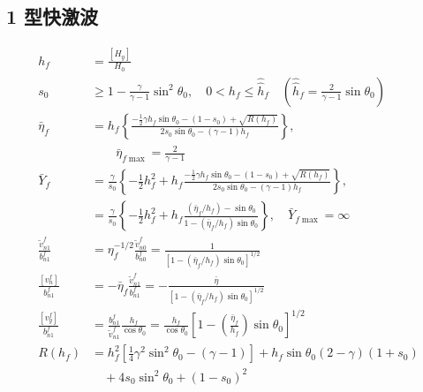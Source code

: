 \documentclass{article}
\begin{document}
\subsection{1 型快激波}
\begin{align}
h_f &= \frac{[H_y]}{H_0}
\\
s_0 &\ge 1 - \frac{\gamma}{\gamma-1} \sin^2\theta_0, \quad 0 < h_f \le \hat{\hat{h}}_f
\quad \left(\hat{\hat{h}}_f = \frac{2}{\gamma-1} \sin\theta_0\right)
\\
\bar{\eta}_f &= h_f \left\{\frac{-\frac{1}{2} \gamma h_f \sin\theta_0 - (1-s_0) +
\sqrt{R(h_f)}}{2s_0 \sin\theta_0 - (\gamma-1) h_f}\right\}, \nonumber\\
& \qquad \bar{\eta}_{f\max} = \frac{2}{\gamma-1}
\\
\bar{Y}_f &= \frac{\gamma}{s_0} \left\{-\frac{1}{2} h_f^2 + h_f \frac{-\frac{1}{2}
\gamma h_f \sin\theta_0 - (1-s_0) + \sqrt{R(h_f)}}{2s_0 \sin\theta_0 - (\gamma-1)
h_f}\right\}, \nonumber
\\
&= \frac{\gamma}{s_0} \left\{-\frac{1}{2} h_f^2 + h_f \frac{(\bar{\eta}_f/h_f) -
\sin\theta_0}{1 - (\bar{\eta}_f/h_f)\sin\theta_0}\right\}, \quad \bar{Y}_{f\max} = \infty
\\
\frac{\tilde{v}_{n1}^f}{b_{n1}^f} &= \eta_f^{-1/2} \frac{\tilde{v}_{n0}^f}{b_{n0}^f} =
\frac{1}{[1 - (\bar{\eta}_f/h_f) \sin\theta_0]^{1/2}}
\\
\frac{[v_n^f]}{b_{n1}^f} &= - \bar{\eta}_f \frac{\tilde{v}_{n1}^f}{b_{n1}^f} =
-\frac{\bar{\eta}}{[1 - (\bar{\eta}_f/h_f) \sin\theta_0]^{1/2}}
\\
\frac{[v_y^f]}{b_{n1}^f} &= \frac{b_{n1}^f}{\tilde{v}_{n1}^f} \frac{h_f}{\cos\theta_0}
= \frac{h_f}{\cos\theta_0} \left[1 - \left(\frac{\bar{\eta}_f}{h_f}\right)
\sin\theta_0\right]^{1/2}
\\
R(h_f) &= h_f^2 \left[\frac{1}{4} \gamma^2 \sin^2\theta_0 - (\gamma - 1)\right] + h_f
\sin\theta_0 (2 - \gamma) (1 + s_0)
\nonumber\\
& \quad + 4s_0 \sin^2\theta_0 + (1 - s_0)^2
\end{align}
\end{document}
